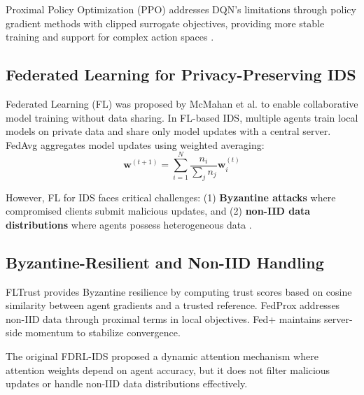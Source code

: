 \documentclass[conference]{IEEEtran}
\begin{document}
Proximal Policy Optimization (PPO) \cite{ppo} addresses DQN's limitations through policy gradient methods with clipped surrogate objectives, providing more stable training and support for complex action spaces \cite{deep_rl_hands_on}.

\subsection{Federated Learning for Privacy-Preserving IDS}

Federated Learning (FL) was proposed by McMahan et al. \cite{federated_avg} to enable collaborative model training without data sharing. In FL-based IDS, multiple agents train local models on private data and share only model updates with a central server. FedAvg aggregates model updates using weighted averaging:
\begin{equation}
\mathbf{w}^{(t+1)} = \sum_{i=1}^{N} \frac{n_i}{\sum_j n_j} \mathbf{w}_i^{(t)}
\end{equation}

However, FL for IDS faces critical challenges: (1) \textbf{Byzantine attacks} where compromised clients submit malicious updates, and (2) \textbf{non-IID data distributions} where agents possess heterogeneous data \cite{fltrust, fedprox}.

\subsection{Byzantine-Resilient and Non-IID Handling}

FLTrust \cite{fltrust} provides Byzantine resilience by computing trust scores based on cosine similarity between agent gradients and a trusted reference. FedProx \cite{fedprox} addresses non-IID data through proximal terms in local objectives. Fed+ \cite{fedplus} maintains server-side momentum to stabilize convergence.

The original FDRL-IDS \cite{original_paper} proposed a dynamic attention mechanism where attention weights depend on agent accuracy, but it does not filter malicious updates or handle non-IID data distributions effectively.
\end{document}
